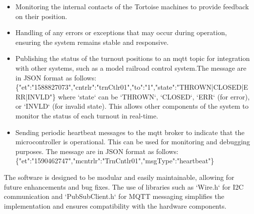 \begin{itemize}
\item Monitoring the internal contacts of the Tortoise machines to provide feedback on their position.
\item Handling of any errors or exceptions that may occur during operation, ensuring the system remains stable and responsive.
\item Publishing the status of the turnout positions to an \gls{mqtt} topic for integration with other systems, such as a model railroad control system.The message are in JSON format as follows:\\
\{"et":"1588827073","cntrlr":"trnCtlr01","to":"1","state":"THROWN|CLOSED|ERR|INVLD"\}
where `state` can be `THROWN`, `CLOSED`, `ERR` (for error), or `INVLD` (for invalid state). This allows other components of the system to monitor the status of each turnout in real-time.
\item Sending periodic heartbeat messages to the \gls{mqtt} broker to indicate that the microcontroller is operational. This can be used for monitoring and debugging purposes. The message are in JSON format as follows:\\
\{"et":"1590462747","mcntrlr":"TrnCntlr01","msgType":"heartbeat"\}
\end{itemize}
The software is designed to be modular and easily maintainable, allowing for future enhancements and bug fixes. The use of libraries such as `Wire.h` for I2C communication and `PubSubClient.h` for MQTT messaging simplifies the implementation and ensures compatibility with the hardware components.
